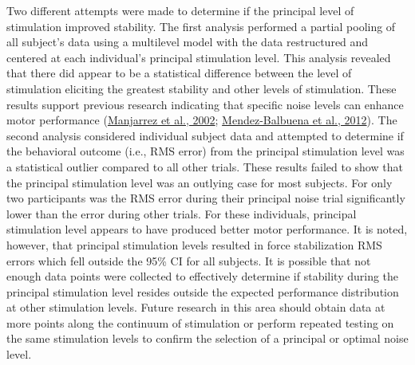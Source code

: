 \documentclass[]{cik}%
\begin{document}
Two different attempts were made to determine if the principal level of
stimulation improved stability. The first analysis performed a partial
pooling of all subject's data using a multilevel model with the data
restructured and centered at each individual's principal stimulation
level. This analysis revealed that there did appear to be a statistical
difference between the level of stimulation eliciting the greatest
stability and other levels of stimulation. These results support
previous research indicating that specific noise levels can enhance
motor performance (\protect\hyperlink{ref-Manjarrez2002}{Manjarrez et
al., 2002}; \protect\hyperlink{ref-Mendez-Balbuena2012}{Mendez-Balbuena
et al., 2012}). The second analysis considered individual subject data
and attempted to determine if the behavioral outcome (i.e., RMS error)
from the principal stimulation level was a statistical outlier compared
to all other trials. These results failed to show that the principal
stimulation level was an outlying case for most subjects. For only two
participants was the RMS error during their principal noise trial
significantly lower than the error during other trials. For these
individuals, principal stimulation level appears to have produced better
motor performance. It is noted, however, that principal stimulation
levels resulted in force stabilization RMS errors which fell outside the
95\% CI for all subjects. It is possible that not enough data points
were collected to effectively determine if stability during the
principal stimulation level resides outside the expected performance
distribution at other stimulation levels. Future research in this area
should obtain data at more points along the continuum of stimulation or
perform repeated testing on the same stimulation levels to confirm the
selection of a principal or optimal noise level.
\end{document}
